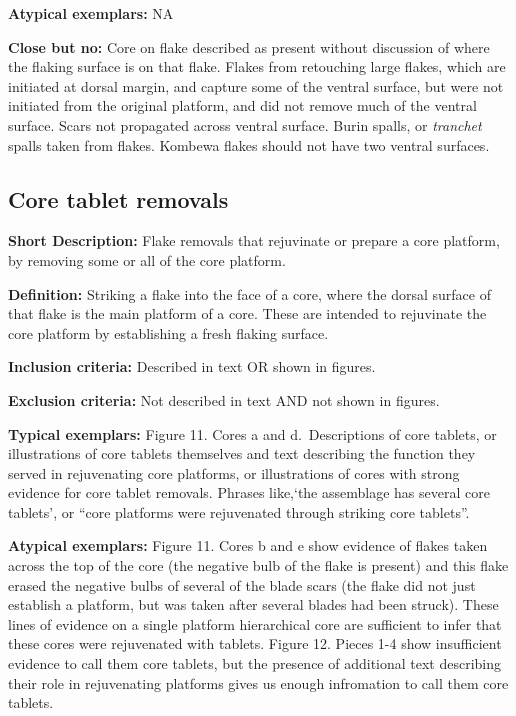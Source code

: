 \documentclass[
]{article}
\begin{document}
\textbf{Atypical exemplars:} NA

\textbf{Close but no:} Core on flake described as present without
discussion of where the flaking surface is on that flake. Flakes from
retouching large flakes, which are initiated at dorsal margin, and
capture some of the ventral surface, but were not initiated from the
original platform, and did not remove much of the ventral surface. Scars
not propagated across ventral surface. Burin spalls, or \emph{tranchet}
spalls taken from flakes. Kombewa flakes should not have two ventral
surfaces.

\hypertarget{core-tablet-removals}{%
\subsection{Core tablet removals}\label{core-tablet-removals}}

\textbf{Short Description:} Flake removals that rejuvinate or prepare a
core platform, by removing some or all of the core platform.

\textbf{Definition:} Striking a flake into the face of a core, where the
dorsal surface of that flake is the main platform of a core. These are
intended to rejuvinate the core platform by establishing a fresh flaking
surface.

\textbf{Inclusion criteria:} Described in text OR shown in figures.

\textbf{Exclusion criteria:} Not described in text AND not shown in
figures.

\textbf{Typical exemplars:} Figure 11. Cores a and d.~Descriptions of
core tablets, or illustrations of core tablets themselves and text
describing the function they served in rejuvenating core platforms, or
illustrations of cores with strong evidence for core tablet removals.
Phrases like,`the assemblage has several core tablets', or ``core
platforms were rejuvenated through striking core tablets''.

\textbf{Atypical exemplars:} Figure 11. Cores b and e show evidence of
flakes taken across the top of the core (the negative bulb of the flake
is present) and this flake erased the negative bulbs of several of the
blade scars (the flake did not just establish a platform, but was taken
after several blades had been struck). These lines of evidence on a
single platform hierarchical core are sufficient to infer that these
cores were rejuvenated with tablets. Figure 12. Pieces 1-4 show
insufficient evidence to call them core tablets, but the presence of
additional text describing their role in rejuvenating platforms gives us
enough infromation to call them core tablets.
\end{document}
